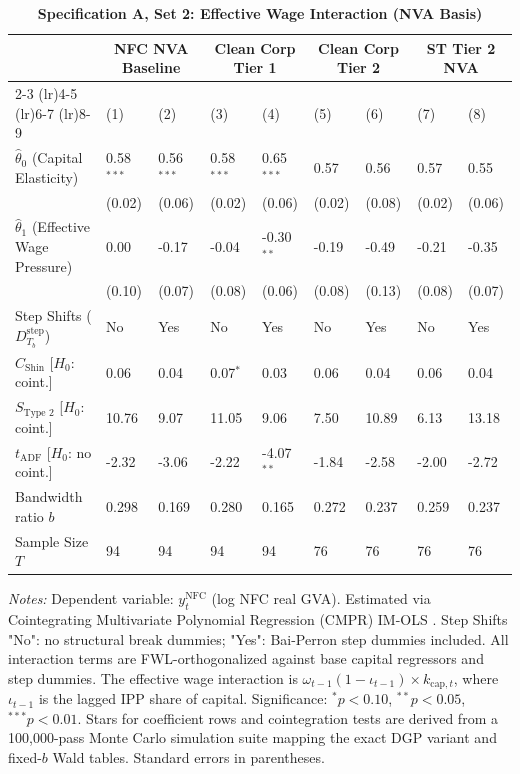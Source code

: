\begin{table}[h!]
\centering
\caption{\textbf{Specification A, Set 2: Effective Wage Interaction (NVA Basis)}}
\label{tab:specA_set2_nva_main}
\small
\begin{tabular}{p{4.2cm}p{1.2cm}p{1.2cm}p{1.2cm}p{1.2cm}p{1.2cm}p{1.2cm}p{1.2cm}p{1.2cm}}
\toprule
 & \multicolumn{2}{c}{NFC NVA Baseline} & \multicolumn{2}{c}{Clean Corp Tier 1} & \multicolumn{2}{c}{Clean Corp Tier 2} & \multicolumn{2}{c}{ST Tier 2 NVA} \\
\cmidrule(lr){2-3} \cmidrule(lr){4-5} \cmidrule(lr){6-7} \cmidrule(lr){8-9}
 & (1) & (2) & (3) & (4) & (5) & (6) & (7) & (8) \\
\midrule
$\hat{\theta}_0$ (Capital Elasticity) & 0.58$^{***}$ & 0.56$^{***}$ & 0.58$^{***}$ & 0.65$^{***}$ & 0.57 & 0.56 & 0.57 & 0.55 \\
 & (0.02) & (0.06) & (0.02) & (0.06) & (0.02) & (0.08) & (0.02) & (0.06) \\
$\hat{\theta}_1$ (Effective Wage Pressure) & 0.00 & -0.17 & -0.04 & -0.30$^{**}$ & -0.19 & -0.49 & -0.21 & -0.35 \\
 & (0.10) & (0.07) & (0.08) & (0.06) & (0.08) & (0.13) & (0.08) & (0.07) \\
\midrule
Step Shifts ($D_{T_b}^{\text{step}}$) & No & Yes & No & Yes & No & Yes & No & Yes \\
$C_{\text{Shin}}$ [$H_0$: coint.] & 0.06 & 0.04 & 0.07$^{*}$ & 0.03 & 0.06 & 0.04 & 0.06 & 0.04 \\
$S_{\text{Type 2}}$ [$H_0$: coint.] & 10.76 & 9.07 & 11.05 & 9.06 & 7.50 & 10.89 & 6.13 & 13.18 \\
$t_{\text{ADF}}$ [$H_0$: no coint.] & -2.32 & -3.06 & -2.22 & -4.07$^{**}$ & -1.84 & -2.58 & -2.00 & -2.72 \\
Bandwidth ratio $b$ & 0.298 & 0.169 & 0.280 & 0.165 & 0.272 & 0.237 & 0.259 & 0.237 \\
Sample Size $T$ & 94 & 94 & 94 & 94 & 76 & 76 & 76 & 76 \\
\bottomrule
\end{tabular}
\begin{minipage}{\textwidth}
\scriptsize
\textit{Notes:} Dependent variable: $y_t^{\text{NFC}}$ (log NFC real GVA). Estimated via Cointegrating Multivariate Polynomial Regression (CMPR) IM-OLS \citep{VogelsangWagner2014}. Step Shifts "No": no structural break dummies; "Yes": Bai-Perron step dummies included. All interaction terms are FWL-orthogonalized against base capital regressors and step dummies. The effective wage interaction is $\omega_{t-1}(1-\iota_{t-1}) \times k_{\text{cap},t}$, where $\iota_{t-1}$ is the lagged IPP share of capital. Significance: $^*p<0.10$, $^{**}p<0.05$, $^{***}p<0.01$. Stars for coefficient rows and cointegration tests are derived from a 100,000-pass Monte Carlo simulation suite mapping the exact DGP variant and fixed-$b$ Wald tables. Standard errors in parentheses.
\end{minipage}
\end{table}
